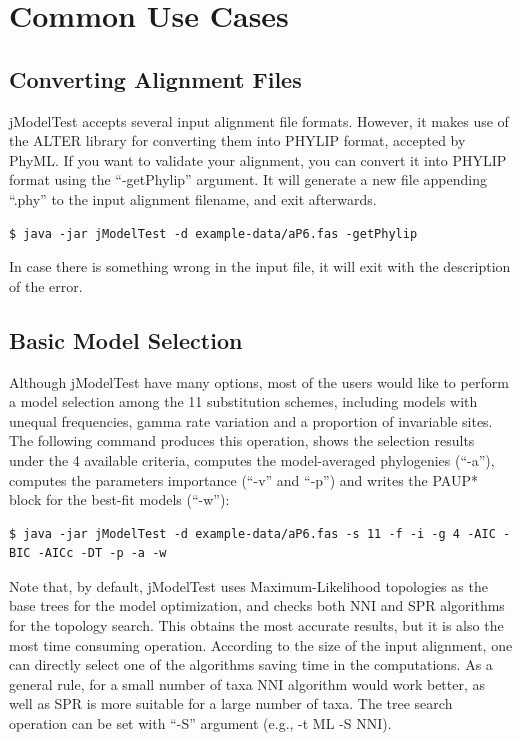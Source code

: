 \documentclass[11pt,twoside,a4paper]{article}
\begin{document}
\section{Common Use Cases}

\subsection{Converting Alignment Files}

jModelTest accepts several input alignment file formats. However, it makes use of the ALTER library for converting them into PHYLIP format, accepted by PhyML. If you want to validate your alignment, you can convert it into PHYLIP format using the ``-getPhylip'' argument. It will generate a new file appending ``.phy'' to the input alignment filename, and exit afterwards.

\begin{lstlisting}
$ java -jar jModelTest -d example-data/aP6.fas -getPhylip
\end{lstlisting}

In case there is something wrong in the input file, it will exit with the description of the error.

\subsection{Basic Model Selection}

Although jModelTest have many options, most of the users would like to perform a model selection among the 11 substitution schemes, including models with unequal frequencies, gamma rate variation and a proportion of invariable sites. The following command produces this operation, shows the selection results under the 4 available criteria, computes the model-averaged phylogenies (``-a''), computes the parameters importance (``-v'' and ``-p'') and writes the PAUP* block for the best-fit models (``-w''):

\begin{lstlisting}
$ java -jar jModelTest -d example-data/aP6.fas -s 11 -f -i -g 4 -AIC -BIC -AICc -DT -p -a -w
\end{lstlisting}

Note that, by default, jModelTest uses Maximum-Likelihood topologies as the base trees for the model optimization, and checks both NNI and SPR algorithms for the topology search. This obtains the most accurate results, but it is also the most time consuming operation. According to the size of the input alignment, one can directly select one of the algorithms saving time in the computations. As a general rule, for a small number of taxa NNI algorithm would work better, as well as SPR is more suitable for a large number of taxa. The tree search operation can be set with ``-S'' argument (e.g., -t ML -S NNI).
\end{document}
